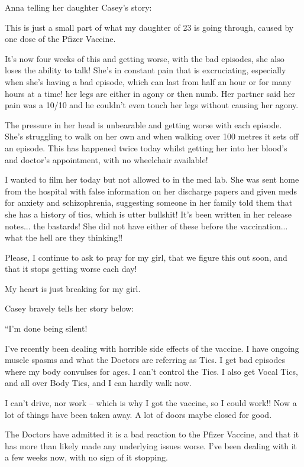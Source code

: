 Anna telling her daughter Casey’s story:

This is just a small part of what my daughter of 23 is going through, caused by
one dose of the Pfizer Vaccine.

It’s now four weeks of this and getting worse, with the bad episodes, she also
loses the ability to talk! She’s in constant pain that is excruciating,
especially when she’s having a bad episode, which can last from half an hour or
for many hours at a time! her legs are either in agony or then numb. Her partner
said her pain was a 10/10 and he couldn’t even touch her legs without causing
her agony.

The pressure in her head is unbearable and getting worse with each
episode. She’s struggling to walk on her own and when walking over 100 metres it
sets off an episode. This has happened twice today whilst getting her into her
blood’s and doctor’s appointment, with no wheelchair available!

I wanted to film her today but not allowed to in the med lab. She was sent home
from the hospital with false information on her discharge papers and given meds
for anxiety and schizophrenia, suggesting someone in her family told them that
she has a history of tics, which is utter bullshit! It’s been written in her
release notes... the bastards! She did not have either of these before the
vaccination... what the hell are they thinking!!

Please, I continue to ask to pray for my girl, that we figure this out soon, and
that it stops getting worse each day!

My heart is just breaking for my girl.

Casey bravely tells her story below:

“I’m done being silent!

I’ve recently been dealing with horrible side effects of the vaccine. I have
ongoing muscle spasms and what the Doctors are referring as Tics. I get bad
episodes where my body convulses for ages. I can’t control the Tics. I also get
Vocal Tics, and all over Body Tics, and I can hardly walk now.

I can’t drive, nor work – which is why I got the vaccine, so I could work!! Now
a lot of things have been taken away. A lot of doors maybe closed for good.

The Doctors have admitted it is a bad reaction to the Pfizer Vaccine, and that
it has more than likely made any underlying issues worse. I’ve been dealing with
it a few weeks now, with no sign of it stopping.


